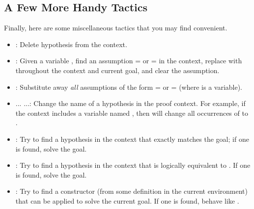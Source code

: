 \documentclass[12pt]{report}
\begin{document}
\subsection{A Few More Handy Tactics}



 Finally, here are some miscellaneous tactics that you may find
    convenient.



\begin{itemize}
\item  {} : Delete hypothesis  from the context.



\item  {} : Given a variable , find an assumption  =  or
        =  in the context, replace  with  throughout the
       context and current goal, and clear the assumption.



\item  {}: Substitute away \textit{all} assumptions of the form  = 
       or  =  (where  is a variable).



\item  {}... ...: Change the name of a hypothesis in the
       proof context.  For example, if the context includes a variable
       named , then     will change all occurrences
       of  to .



\item  {}: Try to find a hypothesis  in the context that
       exactly matches the goal; if one is found, solve the goal.



\item  {}: Try to find a hypothesis  in the context
       that is logically equivalent to .  If one is found,
       solve the goal.



\item  {}: Try to find a constructor  (from some
        definition in the current environment) that can be
       applied to solve the current goal.  If one is found, behave
       like  .

\end{itemize}
\end{document}

